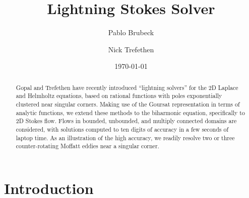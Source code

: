 \documentclass{article}
\begin{document}
\newtheorem{theorem}{Theorem}
\makeatletter
\title{Lightning Stokes Solver}
\author{Pablo Brubeck \and Nick Trefethen}
\date{\today}
\makeatother

\maketitle

\begin{abstract}
Gopal and Trefethen have recently introduced ``lightning solvers''
for the 2D Laplace and Helmholtz equations, based on rational
functions with poles exponentially clustered near singular corners.
Making use of the Goursat representation in terms of analytic
functions, we extend these methods to the biharmonic equation,
specifically to 2D Stokes flow.  Flows in bounded, unbounded, and
multiply connected domains are considered, with solutions computed
to ten digits of accuracy in a few seconds of laptop time.  As an
illustration of the high accuracy, we readily resolve two or three
counter-rotating Moffatt eddies near a singular corner.
\end{abstract}

\linespread{1}

\section{Introduction}
\end{document}
